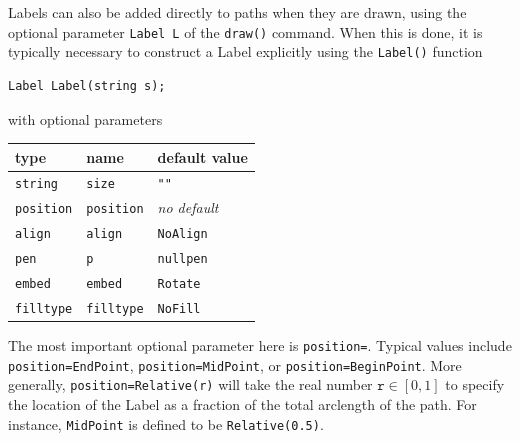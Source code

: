 \documentclass{article}
\begin{document}
Labels can also be added directly to paths when they are drawn, using the optional parameter 
\lstinline!Label L! of the \lstinline!draw()! command.  When this is done, it is typically necessary 
to construct a Label explicitly using the \lstinline!Label()!\label{labelconstruct} function
\begin{lstlisting}
Label Label(string s);
\end{lstlisting}
with optional parameters
\begin{center}
\begin{tabular}{@{}l l l@{}} \toprule
type & name & default value \\ \midrule
\texttt{string} & \texttt{size}\index{size=@\texttt{size=}} & \texttt{""} \\
\texttt{position} & \texttt{position}\index{position=@\texttt{position=}} & \textit{no default}\footnotemark  \\ 
\texttt{align} & \texttt{align} & \texttt{NoAlign} \\
\texttt{pen} & \texttt{p}\index{p=@\texttt{p=}} & \texttt{nullpen} \\
\texttt{embed} & \texttt{embed}\index{embed=@\texttt{embed=}} & \texttt{Rotate} \\
\texttt{filltype} & \texttt{filltype}\index{filltype=@\texttt{filltype=}} & \texttt{NoFill} \\ \bottomrule
\end{tabular}
\end{center}
The most important optional parameter here is \texttt{position=}. Typical
values include \lstinline!position=EndPoint!, \lstinline!position=MidPoint!, or \lstinline!position=BeginPoint!. 
More generally, \lstinline!position=Relative(r)! will take the real number $\mathtt{r} \in [0,1]$ 
to specify the location of the Label as a fraction of the total arclength of the path.  For instance, 
\lstinline!MidPoint! is defined to be \lstinline!Relative(0.5)!.
\end{document}
